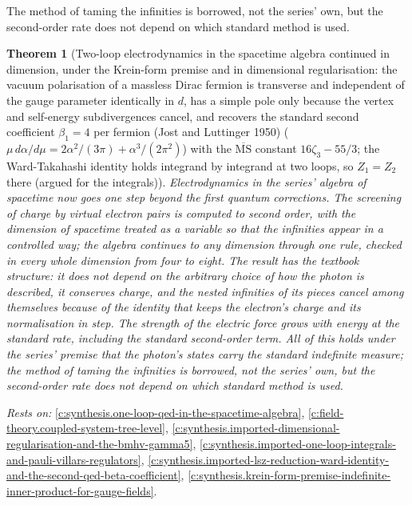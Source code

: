 \documentclass[11pt]{article}
\newtheorem{theorem}{Theorem}[section]
\theoremstyle{definition}
\theoremstyle{plain}
\begin{document}
The method of taming the infinities is borrowed, not the series' own, but the second-order rate does not depend on which standard method is used.

\begin{theorem}[Two-loop electrodynamics in the spacetime algebra continued in dimension, under the Krein-form premise and in dimensional regularisation: the vacuum polarisation of a massless Dirac fermion is transverse and independent of the gauge parameter identically in $d$, has a simple pole only because the vertex and self-energy subdivergences cancel, and recovers the standard second coefficient $\beta_{1} = 4$ per fermion (Jost and Luttinger 1950) ($\mu\,d\alpha/d\mu = 2\alpha^{2}/(3\pi) + \alpha^{3}/(2\pi^{2})$) with the $\overline{\mathrm{MS}}$ constant $16\zeta_{3} - 55/3$; the Ward-Takahashi identity holds integrand by integrand at two loops, so $Z_{1} = Z_{2}$ there (argued for the integrals)]\label{c:synthesis.two-loop-qed-in-the-spacetime-algebra-continued-in-dimension-gives-the-second-beta-coefficient}
Electrodynamics in the series' algebra of spacetime now goes one step beyond the first quantum corrections. The screening of charge by virtual electron pairs is computed to second order, with the dimension of spacetime treated as a variable so that the infinities appear in a controlled way; the algebra continues to any dimension through one rule, checked in every whole dimension from four to eight. The result has the textbook structure: it does not depend on the arbitrary choice of how the photon is described, it conserves charge, and the nested infinities of its pieces cancel among themselves because of the identity that keeps the electron's charge and its normalisation in step. The strength of the electric force grows with energy at the standard rate, including the standard second-order term. All of this holds under the series' premise that the photon's states carry the standard indefinite measure; the method of taming the infinities is borrowed, not the series' own, but the second-order rate does not depend on which standard method is used.
\end{theorem}
\noindent\emph{Rests on:} \ref{c:synthesis.one-loop-qed-in-the-spacetime-algebra}, \ref{c:field-theory.coupled-system-tree-level}, \ref{c:synthesis.imported-dimensional-regularisation-and-the-bmhv-gamma5}, \ref{c:synthesis.imported-one-loop-integrals-and-pauli-villars-regulators}, \ref{c:synthesis.imported-lsz-reduction-ward-identity-and-the-second-qed-beta-coefficient}, \ref{c:synthesis.krein-form-premise-indefinite-inner-product-for-gauge-fields}.
\end{document}
